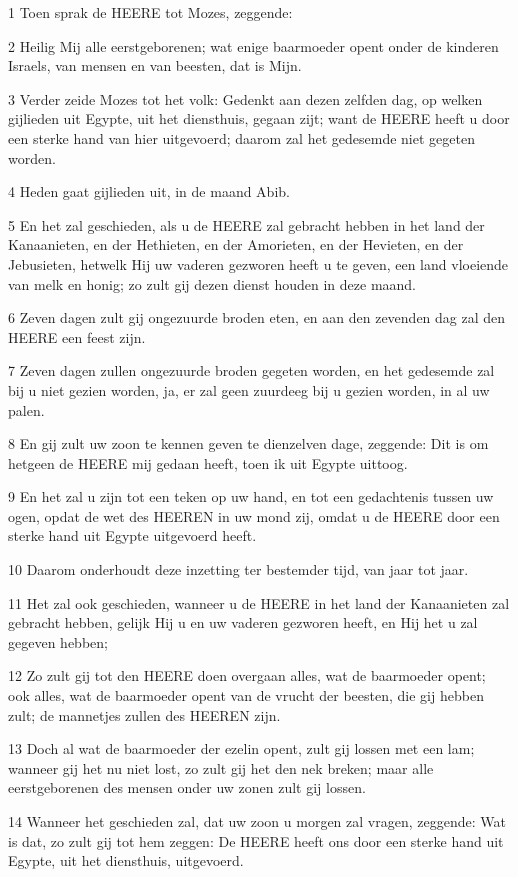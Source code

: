 \par 1 Toen sprak de HEERE tot Mozes, zeggende:
\par 2 Heilig Mij alle eerstgeborenen; wat enige baarmoeder opent onder de kinderen Israels, van mensen en van beesten, dat is Mijn.
\par 3 Verder zeide Mozes tot het volk: Gedenkt aan dezen zelfden dag, op welken gijlieden uit Egypte, uit het diensthuis, gegaan zijt; want de HEERE heeft u door een sterke hand van hier uitgevoerd; daarom zal het gedesemde niet gegeten worden.
\par 4 Heden gaat gijlieden uit, in de maand Abib.
\par 5 En het zal geschieden, als u de HEERE zal gebracht hebben in het land der Kanaanieten, en der Hethieten, en der Amorieten, en der Hevieten, en der Jebusieten, hetwelk Hij uw vaderen gezworen heeft u te geven, een land vloeiende van melk en honig; zo zult gij dezen dienst houden in deze maand.
\par 6 Zeven dagen zult gij ongezuurde broden eten, en aan den zevenden dag zal den HEERE een feest zijn.
\par 7 Zeven dagen zullen ongezuurde broden gegeten worden, en het gedesemde zal bij u niet gezien worden, ja, er zal geen zuurdeeg bij u gezien worden, in al uw palen.
\par 8 En gij zult uw zoon te kennen geven te dienzelven dage, zeggende: Dit is om hetgeen de HEERE mij gedaan heeft, toen ik uit Egypte uittoog.
\par 9 En het zal u zijn tot een teken op uw hand, en tot een gedachtenis tussen uw ogen, opdat de wet des HEEREN in uw mond zij, omdat u de HEERE door een sterke hand uit Egypte uitgevoerd heeft.
\par 10 Daarom onderhoudt deze inzetting ter bestemder tijd, van jaar tot jaar.
\par 11 Het zal ook geschieden, wanneer u de HEERE in het land der Kanaanieten zal gebracht hebben, gelijk Hij u en uw vaderen gezworen heeft, en Hij het u zal gegeven hebben;
\par 12 Zo zult gij tot den HEERE doen overgaan alles, wat de baarmoeder opent; ook alles, wat de baarmoeder opent van de vrucht der beesten, die gij hebben zult; de mannetjes zullen des HEEREN zijn.
\par 13 Doch al wat de baarmoeder der ezelin opent, zult gij lossen met een lam; wanneer gij het nu niet lost, zo zult gij het den nek breken; maar alle eerstgeborenen des mensen onder uw zonen zult gij lossen.
\par 14 Wanneer het geschieden zal, dat uw zoon u morgen zal vragen, zeggende: Wat is dat, zo zult gij tot hem zeggen: De HEERE heeft ons door een sterke hand uit Egypte, uit het diensthuis, uitgevoerd.
